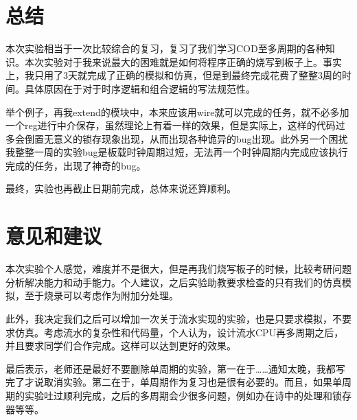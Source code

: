 \documentclass[12pt, a4paper]{article}
\begin{document}










\section {总结}
本次实验相当于一次比较综合的复习，复习了我们学习COD至多周期的各种知识。本次实验对于我来说最大的困难就是如何将程序正确的烧写到板子上。事实上，我只用了3天就完成了正确的模拟和仿真，但是到最终完成花费了整整3周的时间。具体原因在于对于时序逻辑和组合逻辑的写法规范性。

举个例子，再我extend的模块中，本来应该用wire就可以完成的任务，就不必多加一个reg进行中介保存，虽然理论上有着一样的效果，但是实际上，这样的代码过多会倒置无意义的锁存现象出现，从而出现各种诡异的bug出现。此外另一个困扰我整整一周的实验bug是板载时钟周期过短，无法再一个时钟周期内完成应该执行完成的任务，出现了神奇的bug。

最终，实验也再截止日期前完成，总体来说还算顺利。

\section{意见和建议}
本次实验个人感觉，难度并不是很大，但是再我们烧写板子的时候，比较考研问题分析解决能力和动手能力。个人建议，之后实验助教要求检查的只有我们的仿真模拟，至于烧录可以考虑作为附加分处理。

此外，我决定我们之后可以增加一次关于流水实现的实验，也是只要求模拟，不要求仿真。考虑流水的复杂性和代码量，个人认为，设计流水CPU再多周期之后，并且要求同学们合作完成。这样可以达到更好的效果。

最后表示，老师还是最好不要删除单周期的实验，第一在于……通知太晚，我都写完了才说取消实验。第二在于，单周期作为复习也是很有必要的。而且，如果单周期的实验吐过顺利完成，之后的多周期会少很多问题，例如办在诗中的处理和锁存器等等。
\end{document}

